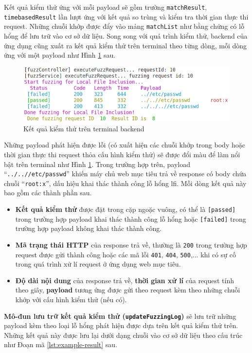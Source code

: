 Kết quả kiểm thử ứng với mỗi payload sẽ gồm trường \texttt{matchResult}, \texttt{timebasedResult} lần lượt ứng với kết quả so trùng và kiểm tra thời gian thực thi request. Những chuỗi khớp được đẩy vào mảng \texttt{matchList} như bằng chứng có lỗ hổng để lưu trữ vào cơ sở dữ liệu. Song song với quá trình kiểm thử, backend của ứng dụng cũng xuất ra kết quả kiểm thử trên terminal theo từng dòng, mỗi dòng ứng với một payload như Hình \ref{fig:terminal-result} sau.
\begin{figure}[H]
  \centering
    \includegraphics[width=\textwidth,keepaspectratio=true]{images/terminal-result.png}
  \caption{Kết quả kiểm thử trên terminal backend}
  \label{fig:terminal-result}
\end{figure}
Những payload phát hiện được lỗi (có xuất hiện các chuỗi khớp trong body hoặc thời gian thực thi request thỏa cấu hình kiểm thử) sẽ được đổi màu để làm nổi bật trên terminal như Hình \ref{fig:terminal-result}. Trong trường hợp trên, payload ``\texttt{../..//etc/passwd}'' khiến máy chủ web mục tiêu trả về response có body chứa chuỗi ``\texttt{root:x}'', dấu hiệu khai thác thành công lỗ hổng \acrshort{lfi}. Mỗi dòng kết quả này bao gồm các thành phần sau.
\begin{itemize}
  \item \textbf{Kết quả kiểm thử} được đặt trong cặp ngoặc vuông, có thể là \texttt{[passed]} trong trường hợp payload khai thác thành công lỗ hổng hoặc \texttt{[failed]} trong trường hợp payload không khai thác thành công.
  \item \textbf{Mã trạng thái HTTP} của response trả về, thường là \texttt{200} trong trường hợp request được gửi thành công hoặc các mã lỗi \texttt{401}, \texttt{404}, \texttt{500},... khi có sự cố trong quá trình xử lí request ở ứng dụng web mục tiêu.
  \item \textbf{Độ dài nội dung} của response trả về, \textbf{thời gian xử lí} của request tính theo giây, \textbf{payload} tương ứng được gửi theo request kèm theo những chuỗi khớp với cấu hình kiểm thử (nếu có).
\end{itemize}
\textbf{Mô-đun lưu trữ kết quả kiểm thử (\texttt{updateFuzzingLog})} sẽ lưu trữ những payload kèm theo loại lỗ hổng phát hiện được dựa trên kết quả kiểm thử trên. Những kết quả này được lưu lại dưới dạng chuỗi vào cơ sở dữ liệu theo cấu trúc như Đoạn mã \ref{lst:example-result} sau.
